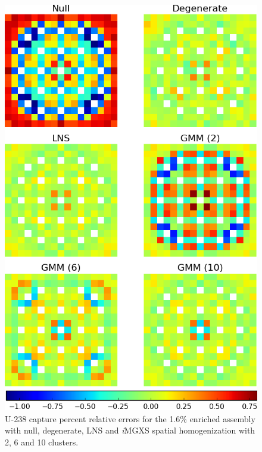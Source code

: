 \begin{figure}[h!]
\centering
\includegraphics[width=0.9\linewidth]{figures/results/spatial/assm-16/capt-err}
\vspace{2mm}
\caption[U-238 capture errors for the 1.6\% enriched assembly]{U-238 capture percent relative errors for the 1.6\% enriched assembly with null, degenerate, \ac{LNS} and \textit{i}\ac{MGXS} spatial homogenization with 2, 6 and 10 clusters.}
\label{fig:chap11-assm-1.6-capt-err}
\end{figure}

\clearpage

